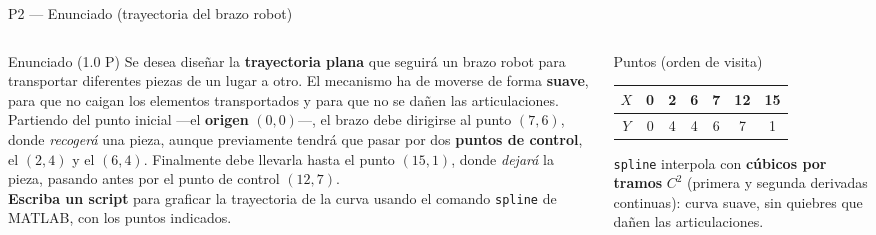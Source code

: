 \documentclass[aspectratio=169,10pt]{beamer}
\begin{document}
\begin{frame}{P2 — Enunciado (trayectoria del brazo robot)}
\begin{columns}[T]
\begin{column}{0.58\textwidth}
\begin{cardidea}{Enunciado \textmd{\small(1.0 P)}}{\faQuestionCircle}
{\footnotesize Se desea diseñar la \textbf{trayectoria plana} que seguirá un brazo robot para transportar diferentes piezas de un lugar a otro. El mecanismo ha de moverse de forma \textbf{suave}, para que no caigan los elementos transportados y para que no se dañen las articulaciones.\\[0.8mm]
Partiendo del punto inicial —el \textbf{origen} $(0,0)$—, el brazo debe dirigirse al punto $(7,6)$, donde \emph{recogerá} una pieza, aunque previamente tendrá que pasar por dos \textbf{puntos de control}, el $(2,4)$ y el $(6,4)$. Finalmente debe llevarla hasta el punto $(15,1)$, donde \emph{dejará} la pieza, pasando antes por el punto de control $(12,7)$.\\[0.8mm]
\textbf{Escriba un script} para graficar la trayectoria de la curva usando el comando \texttt{spline} de MATLAB, con los puntos indicados.}
\end{cardidea}
\end{column}
\begin{column}{0.4\textwidth}
\begin{cardgear}{Puntos (orden de visita)}{\faTable}
\centering
{\footnotesize\renewcommand{\arraystretch}{1.3}\setlength{\tabcolsep}{5pt}
\begin{tabular}{c|cccccc}
$X$ & 0 & 2 & 6 & 7 & 12 & 15\\\hline
$Y$ & 0 & 4 & 4 & 6 & 7 & 1\\
\end{tabular}}
\end{cardgear}
\vspace{1mm}
\begin{cardnota}[\faInfoCircle]
{\footnotesize \texttt{spline} interpola con \textbf{cúbicos por tramos} $C^2$ (primera y segunda derivadas continuas): curva suave, sin quiebres que dañen las articulaciones.}
\end{cardnota}
\end{column}
\end{columns}
\end{frame}
\end{document}
